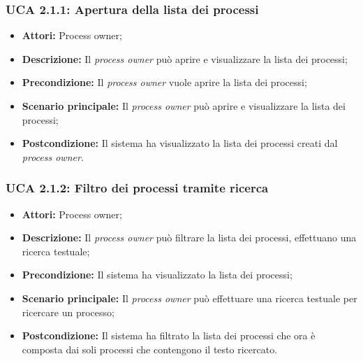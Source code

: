 \hypertarget{A2.1.1}{}
\subsubsection{UCA 2.1.1: Apertura della lista dei processi}
\begin{itemize}
\item \textbf{Attori:} Process owner;
\item \textbf{Descrizione:} Il \textit{process owner} può aprire e visualizzare la lista dei processi;
\item \textbf{Precondizione:} Il \textit{process owner} vuole aprire la lista dei processi;\\
\item \textbf{Scenario principale:} Il \textit{process owner} può aprire e visualizzare la lista dei processi;
\item \textbf{Postcondizione:} Il sistema ha visualizzato la lista dei processi creati dal \textit{process owner}.
\end{itemize}

\hypertarget{A2.1.2}{}
\subsubsection{UCA 2.1.2: Filtro dei processi tramite ricerca}
\begin{itemize}
\item \textbf{Attori:} Process owner;
\item \textbf{Descrizione:} Il \textit{process owner} può filtrare la lista dei processi, effettuano una ricerca testuale;
\item \textbf{Precondizione:} Il sistema ha visualizzato la lista dei processi;
\item \textbf{Scenario principale:} Il \textit{process owner} può effettuare una ricerca testuale per ricercare un processo;
\item \textbf{Postcondizione:} Il sistema ha filtrato la lista dei processi che ora è composta dai soli processi che contengono il testo ricercato.
\end{itemize}

